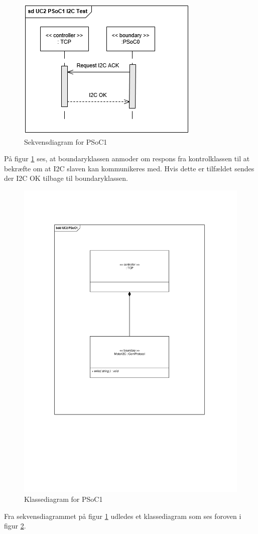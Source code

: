 \begin{figure}[H]
	\centering
	\includegraphics[width=.8\textwidth] {Systemarkitektur/images/SDPSoC1I2CTest}
	\caption{Sekvensdiagram for PSoC1}
	\label{fig:sekvensPSoC1I2CTest}
\end{figure}

På figur \ref{fig:sekvensPSoC1I2CTest} ses, at boundaryklassen anmoder om respons fra kontrolklassen til at bekræfte om at I2C slaven kan kommunikeres med. Hvis dette er tilfældet sendes der I2C OK tilbage til boundaryklassen.  

\begin{figure}[H]
	\centering
	\includegraphics[width=.5\textwidth]{Systemarkitektur/images/klassediagramPSoC1}
	\caption{Klassediagram for PSoC1}
	\label{fig:klassePSoC1}
\end{figure}

Fra sekvensdiagrammet på figur \ref{fig:sekvensPSoC1I2CTest} udledes et klassediagram som ses foroven i figur \ref{fig:klassePSoC1}.

